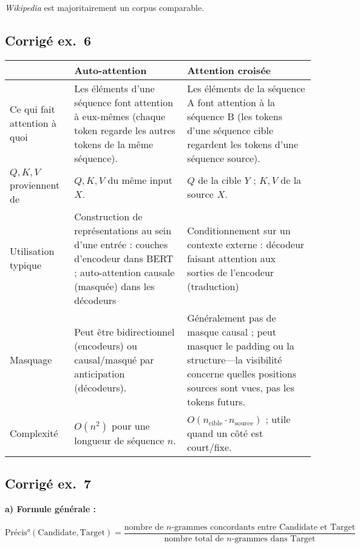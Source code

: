 \documentclass[11pt,a4paper]{article}
\begin{document}
\begin{description}[
  leftmargin=0pt,
  style=nextline,
  font=\normalfont,
  itemsep=1.0\baselineskip,
  parsep=0pt
]
\textit{Wikipedia} est majoritairement un corpus comparable.

\clearpage
\begin{landscape}
\subsection*{Corrigé ex.~6}
\begin{table}[ht]
\centering
\begin{tabular}{|l|p{7cm}|p{7cm}|}
\hline
\textbf{} & \textbf{Auto-attention} & \textbf{Attention croisée} \\
\hline
Ce qui fait attention à quoi & Les éléments d'une séquence font attention à eux-mêmes (chaque token regarde les autres tokens de la même séquence). & Les éléments de la séquence A font attention à la séquence B (les tokens d'une séquence cible regardent les tokens d'une séquence source). \\
\hline
$Q,K,V$ proviennent de & $Q,K,V$ du même input $X$. & $Q$ de la cible $Y$ ; $K,V$ de la source $X$. \\
\hline
Utilisation typique & Construction de représentations au sein d'une entrée : couches d'encodeur dans BERT ; auto-attention causale (masquée) dans les décodeurs & Conditionnement sur un contexte externe : décodeur faisant attention aux sorties de l'encodeur (traduction) \\
\hline
Masquage & Peut être bidirectionnel (encodeurs) ou causal/masqué par anticipation (décodeurs). & Généralement pas de masque causal ; peut masquer le padding ou la structure—la visibilité concerne quelles positions sources sont vues, pas les tokens futurs. \\
\hline
Complexité & $O(n^2)$ pour une longueur de séquence $n$. & $O(n_{\text{cible}}\cdot n_{\text{source}})$ ; utile quand un côté est court/fixe. \\

\hline
\end{tabular}
\end{table}
\end{landscape}
\clearpage

\subsection*{Corrigé ex.~7}
\textbf{a) Formule générale :}

\[
\text{Précis°}(\text{Candidate}, \text{Target}) =
\frac{
\text{nombre de } n\text{-grammes concordants entre Candidate et Target}
}{
\text{nombre total de } n\text{-grammes dans Target}
}
\]


\end{description}
\end{document}
